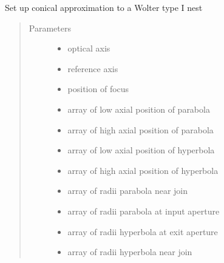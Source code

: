 \documentclass[letterpaper,10pt,english]{sphinxmanual}
\begin{document}
\begin{fulllineitems}
\label{\detokenize{xsrt_functions:xsrt.c1nest}}
Set up conical approximation to a Wolter type I nest
\begin{quote}\begin{description}
\item[{Parameters}] \leavevmode\begin{itemize}
\item {} 
 \textendash{} optical axis

\item {} 
 \textendash{} reference axis

\item {} 
 \textendash{} position of focus

\item {} 
 \textendash{} array of low axial position of parabola

\item {} 
 \textendash{} array of high axial position of parabola

\item {} 
 \textendash{} array of low axial position of hyperbola

\item {} 
 \textendash{} array of high axial position of hyperbola

\item {} 
 \textendash{} array of radii parabola near join

\item {} 
 \textendash{} array of radii parabola at input aperture

\item {} 
 \textendash{} array of radii hyperbola at exit aperture

\item {} 
 \textendash{} array of radii hyperbola near join


\end{itemize}
\end{description}
\end{quote}
\end{fulllineitems}
\end{document}
